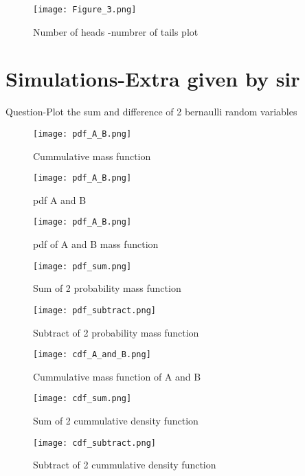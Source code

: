 \documentclass[journel,12pt,twocoloums]{IEEEtran}
\begin{document}
{\begin{figure}
    \centering
    \texttt{[image: Figure\_3.png]}
    \caption{Number of heads -numbrer of tails plot}
    \label{fig:my_label}
\end{figure}

\section{Simulations-Extra given by sir}
Question-Plot the sum and difference of 2 bernaulli random variables\\

\begin{figure}
    \centering
    \texttt{[image: pdf\_A\_B.png]}
    \caption{Cummulative mass function}
    \label{fig:my_label}
\end{figure}

\begin{figure}
    \centering
    \texttt{[image: pdf\_A\_B.png]}
    \caption{pdf A and B}
    \label{fig:my_label}
\end{figure}

\begin{figure}
    \centering
    \texttt{[image: pdf\_A\_B.png]}
    \caption{pdf of A and B mass function}
    \label{fig:my_label}
\end{figure}
\begin{figure}
    \centering
    \texttt{[image: pdf\_sum.png]}
    \caption{Sum of 2 probability mass function}
    \label{fig:my_label}
\end{figure}
\begin{figure}
    \centering
    \texttt{[image: pdf\_subtract.png]}
    \caption{Subtract of 2 probability mass function}
    \label{fig:my_label}
\end{figure}
\begin{figure}
    \centering
    \texttt{[image: cdf\_A\_and\_B.png]}
    \caption{Cummulative mass function of A and B}
    \label{fig:my_label}
\end{figure}
\begin{figure}
    \centering
    \texttt{[image: cdf\_sum.png]}
    \caption{Sum of 2 cummulative density function}
    \label{fig:my_label}
\end{figure}
\begin{figure}
    \centering
    \texttt{[image: cdf\_subtract.png]}
    \caption{Subtract of 2 cummulative density function}
    \label{fig:my_label}
\end{figure}

}
\end{document}
